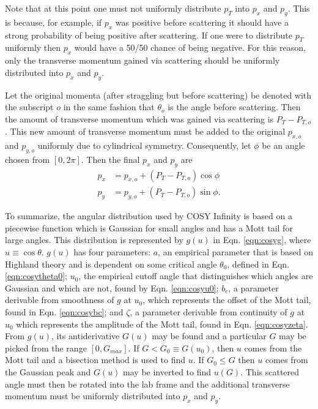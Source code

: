 Note that at this point one must not uniformly distribute $p_T$ into $p_x$ and $p_y$. This is because, for example, if $p_x$ was positive before scattering it should have a strong probability of being positive after scattering. If one were to distribute $p_T$ uniformly then $p_x$ would have a 50/50 chance of being negative. For this reason, only the transverse momentum gained via scattering should be uniformly distributed into $p_x$ and $p_y$.

Let the original momenta (after straggling but before scattering) be denoted with the subscript $o$ in the same fashion that $\theta_o$ is the angle before scattering. Then the amount of transverse momentum which was gained via scattering is $P_T-P_{T,o}$. This new amount of transverse momentum must be added to the original $p_{x,o}$ and $p_{y,o}$ uniformly due to cylindrical symmetry. Consequently, let $\phi$ be an angle chosen from $[0,2\pi]$. Then the final $p_x$ and $p_y$ are
\begin{align*}
p_x&=p_{x,o}+(P_T-P_{T,o})\cos\phi\\
p_y&=p_{y,o}+(P_T-P_{T,o})\sin\phi.
\end{align*}

To summarize, the angular distribution used by COSY Infinity is based on a piecewise function which is Gaussian for small angles \cite{gs} and has a Mott tail for large angles. This distribution is represented by $g(u)$ in Eqn. \ref{eqn:cosyg}, where $u\equiv \cos\theta$. $g(u)$ has four parameters: $a$, an empirical parameter that is based on Highland theory \cite{highland} and is dependent on some critical angle $\theta_0$, defined in Eqn. \ref{eqn:cosytheta0}; $u_0$, the empirical cutoff angle that distinguishes which angles are Gaussian and which are not, found by Eqn. \ref{eqn:cosyu0}; $b_c$, a parameter derivable from smoothness of $g$ at $u_0$, which represents the offset of the Mott tail, found in Eqn. \ref{eqn:cosybc}; and $\zeta$, a parameter derivable from continuity of $g$ at $u_0$ which represents the amplitude of the Mott tail, found in Eqn. \ref{eqn:cosyzeta}. From $g(u)$, its antiderivative $G(u)$ may be found and a particular $G$ may be picked from the range $[0,G_{max}]$. If $G<G_0 \equiv G(u_0)$, then $u$ comes from the Mott tail and a bisection method is used to find $u$. If $G_0 \leq G$ then $u$ comes from the Gaussian peak and $G(u)$ may be inverted to find $u(G)$. This scattered angle must then be rotated into the lab frame and the additional transverse momentum must be uniformly distributed into $p_x$ and $p_y$.

